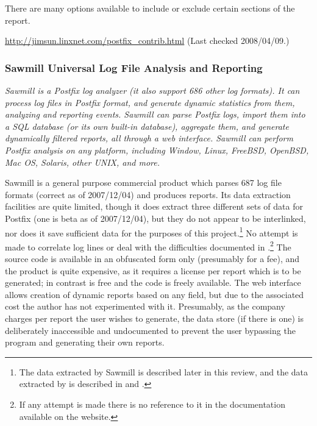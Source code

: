 There are many options available to include or exclude certain sections of
the report.

\url{http://jimsun.linxnet.com/postfix_contrib.html} \newline (Last checked
2008/04/09.)

\subsubsection{Sawmill Universal Log File Analysis and Reporting}

\textit{ Sawmill is a Postfix log analyzer (it also support 686 other log
formats).  It can process log files in Postfix format, and generate dynamic
statistics from them, analyzing and reporting events.  Sawmill can parse
Postfix logs, import them into a SQL database (or its own built-in
database), aggregate them, and generate dynamically filtered reports, all
through a web interface.  Sawmill can perform Postfix analysis on any
platform, including Window, Linux, FreeBSD, OpenBSD, Mac OS, Solaris, other
UNIX, and more.\/}

Sawmill is a general purpose commercial product which parses 687 log file
formats (correct as of 2007/12/04) and produces reports.  Its data
extraction facilities are quite limited, though it does extract three
different sets of data for Postfix (one is beta as of 2007/12/04), but they
do not appear to be interlinked, nor does it save sufficient data for the
purposes of this project.\footnote{The data extracted by Sawmill is
described later in this review, and the data extracted by \PLP{} is
described in  and .}  No attempt is made to correlate log lines or deal with the
difficulties documented in 
.\footnote{If any attempt is made
there is no reference to it in the documentation available on the website.}
The source code is available in an obfuscated form only (presumably for a
fee), and the product is quite expensive, as it requires a license per
report which is to be generated; in contrast \parsername{} is free and the
code is freely available.  The web interface allows creation of dynamic
reports based on any field, but due to the associated cost the author has
not experimented with it.  Presumably, as the company charges per report
the user wishes to generate, the data store (if there is one) is
deliberately inaccessible and undocumented to prevent the user bypassing
the program and generating their own reports.

